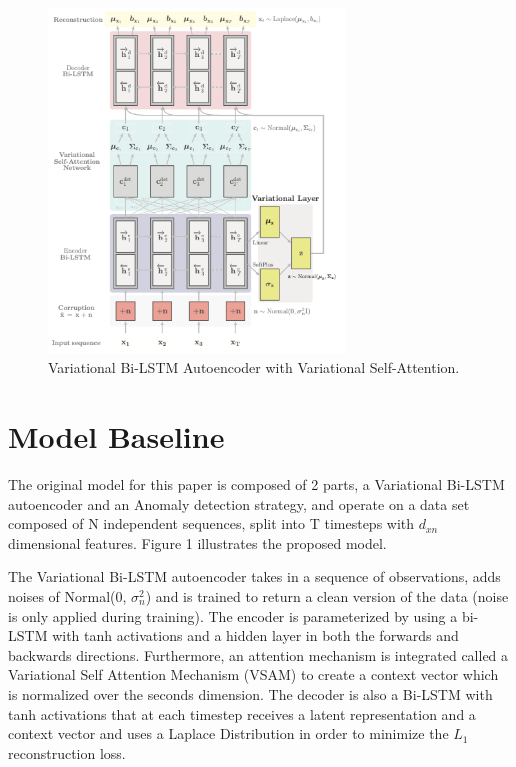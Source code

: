 \documentclass{article}
\begin{document}
\begin{figure}[!t]
    \centering
    \includegraphics[width=0.7\textwidth]{images/BiLSTM.png}
    \caption{Variational Bi-LSTM Autoencoder with Variational Self-Attention.}
\end{figure}
\section{Model Baseline}
The original model for this paper is composed of 2 parts, a Variational Bi-LSTM autoencoder and an Anomaly detection strategy, and operate on a data set composed of N independent sequences, split into T timesteps with $d_{xn}$ dimensional features. Figure 1 illustrates the proposed model.

The Variational Bi-LSTM autoencoder takes in a sequence of observations, adds noises of Normal(0, $\sigma_{n}^2$) and is trained to return a  clean version of the data (noise is only applied during training). The encoder is parameterized by using a bi-LSTM with tanh activations and a hidden layer in both the forwards and backwards directions. Furthermore, an attention mechanism is integrated called a Variational Self Attention Mechanism (VSAM) to create a context vector which is normalized over
the seconds dimension. The decoder is also a Bi-LSTM with tanh activations that at each timestep receives a latent representation and a context vector and uses a Laplace Distribution in order to minimize the $L_1$ reconstruction loss.
\end{document}
